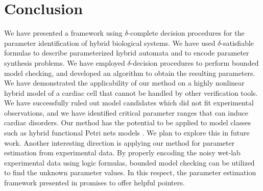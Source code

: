 \section{Conclusion}
We have presented a framework using $\delta$-complete decision procedures for the parameter identification 
of hybrid biological systems. We have used $\delta$-satisfiable formulas to describe parameterized hybrid automata 
and to encode parameter synthesis problems. We have employed $\delta$-decision procedures to perform bounded model 
checking, and developed an algorithm to obtain the resulting parameters.
We have demonstrated the applicability of our method on a highly nonlinear hybrid model of a cardiac cell that cannot
be handled by other verification tools. We have successfully ruled out model candidates which did not fit 
experimental observations, and we have identified critical parameter ranges that can induce cardiac disorders.
Our method has the potential to be applied to model classes such as hybrid functional Petri nets models \citep{hfpn}. 
We plan to explore this in future work. Another interesting direction is applying our method for parameter estimation 
from experimental data. By properly encoding the noisy wet-lab experimental data using logic formulas, bounded model 
checking can be utilized to find the unknown parameter values. 
In this respect, the parameter estimation framework presented in \cite{liu13} promises to offer helpful pointers.









